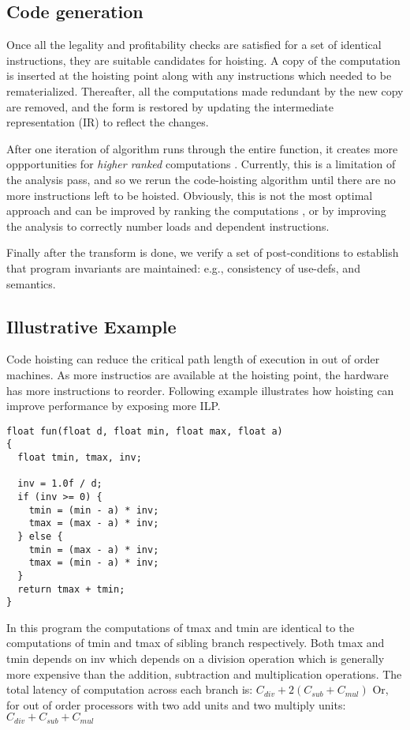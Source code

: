 \documentclass{sig-alternate}
\begin{document}
\subsection{Code generation}
Once all the legality and profitability checks are satisfied for a set of
identical instructions, they are suitable candidates for hoisting. A copy of the
computation is inserted at the hoisting point along with any instructions which
needed to be rematerialized. Thereafter, all the computations made redundant by
the new copy are removed, and the \SSA{} form is restored by updating the
intermediate representation (IR) to reflect the changes.

After one iteration of algorithm runs through the entire function, it creates
more oppportunities for \emph{higher ranked} computations
\cite{rosen1988global}. Currently, this is a limitation of the \GVN{} analysis
pass, and so we rerun the code-hoisting algorithm until there are no more
instructions left to be hoisted.  Obviously, this is not the most optimal
approach and can be improved by ranking the computations \cite{rosen1988global},
or by improving the \GVN{} analysis to correctly number loads and dependent
instructions.

Finally after the transform is done, we verify a set of post-conditions to
establish that program invariants are maintained: e.g., consistency of
use-defs, and \SSA{} semantics.

\newpage

\subsection{Illustrative Example} \label{subsec:example}
Code hoisting can reduce the critical path length of execution in out of
order machines. As more instructios are available at the hoisting point, the
hardware has more instructions to reorder. Following example illustrates how
hoisting can improve performance by exposing more ILP.

\begin{verbatim}
float fun(float d, float min, float max, float a)
{
  float tmin, tmax, inv;

  inv = 1.0f / d;
  if (inv >= 0) {
    tmin = (min - a) * inv;
    tmax = (max - a) * inv;
  } else {
    tmin = (max - a) * inv;
    tmax = (min - a) * inv;
  }
  return tmax + tmin;
}
\end{verbatim}

In this program the computations of tmax and tmin are identical to the
computations of tmin and tmax of sibling branch respectively. Both tmax and tmin
depends on inv which depends on a division operation which is generally more
expensive than the addition, subtraction and multiplication operations. The
total latency of computation across each branch is:
$C_{div} + 2(C_{sub} + C_{mul})$
Or, for out of order processors with two add units and two multiply units:
$C_{div} + C_{sub} + C_{mul}$
\end{document}
